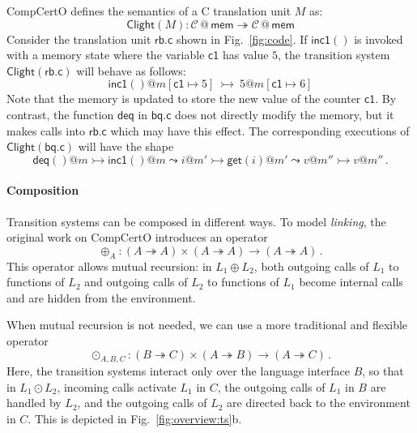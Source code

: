 \documentclass[acmsmall,screen,review,anonymous]{acmart}
\newcommand{\kw}[1]{\ensuremath{ \mathsf{#1} }}
\begin{document}
\begin{example} \label{ex:overview:clightsem} %
CompCertO defines
the semantics of a C translation unit $M$
as:
\[
  \kw{Clight}(M) :
    \mathcal{C} \mathbin@ \kw{mem} \twoheadrightarrow
    \mathcal{C} \mathbin@ \kw{mem}
\]
%
Consider the translation unit $\kw{rb.c}$ shown in Fig.~\ref{fig:code}.
If $\kw{inc1}()$ is invoked
with a memory state where the variable $\kw{c1}$ has value $5$,
the transition system $\kw{Clight}(\kw{rb.c})$ will behave as follows:
\[
  \kw{inc1}()@m[\kw{c1} \mapsto 5]
  \: \rightarrowtail \:
  5@m[\kw{c1} \mapsto 6]
\]
Note that the memory is updated to store the new value of the counter $\kw{c1}$.
By contrast, the function $\kw{deq}$ in $\kw{bq.c}$
does not directly modify the memory,
but it makes calls into $\kw{rb.c}$ which may have this effect.
The corresponding executions of $\kw{Clight}(\kw{bq.c})$
will have the shape
\[
  \kw{deq}()@m
  \rightarrowtail
  \kw{inc1}()@m \leadsto i@m'
  \rightarrowtail
  \kw{get}(i)@m' \leadsto v@m''
  \rightarrowtail
  v@m''
  \,.
\]
\end{example}


\paragraph{Composition} %

Transition systems can be composed in different ways.
To model \emph{linking}, the original work on CompCertO introduces an operator
\[
  {\oplus}_A : (A \twoheadrightarrow A) \times (A \twoheadrightarrow A)
  \rightarrow (A \twoheadrightarrow A)
  \,.
\]
This operator allows mutual recursion:
in $L_1 \oplus L_2$, both
outgoing calls of $L_1$ to functions of $L_2$ and
outgoing calls of $L_2$ to functions of $L_1$
become internal calls and are hidden from the environment.

When mutual recursion is not needed,
we can use a more traditional and flexible operator
\[
  {\odot}_{A,B,C} :
    (B \twoheadrightarrow C) \times
    (A \twoheadrightarrow B) \rightarrow
    (A \twoheadrightarrow C)
  \,.
\]
Here,
the transition systems interact only over
the language interface $B$,
so that in $L_1 \odot L_2$,
incoming calls activate $L_1$ in $C$,
the outgoing calls of $L_1$ in $B$ are handled by $L_2$, and
the outgoing calls of $L_2$
are directed back to the environment in $C$.
This is depicted in Fig.~\ref{fig:overview:ts}b.
\end{document}

